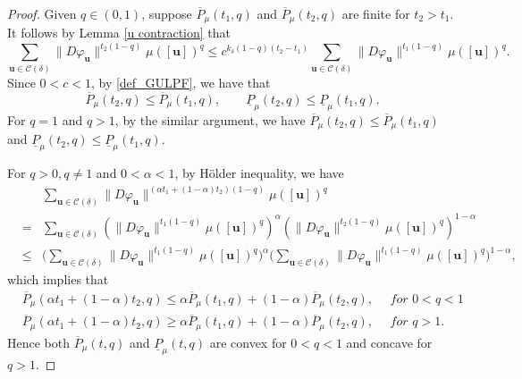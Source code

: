 \documentclass[12pt]{amsart}
\theoremstyle{plain}
\theoremstyle{definition}
\theoremstyle{remark}
\newcommand{\bu}{\mathbf{u}}
\begin{document}
\begin{proof}
Given $q\in(0, 1)$,  suppose $\overline P_\mu(t_1, q)$ and $\overline P_\mu(t_2, q)$ are finite for $t_2>t_1$. It follows by Lemma \ref{u contraction} that
$$
\sum_{\mathbf{u}\in\mathcal{C}(\delta)}\|D\varphi_\mathbf{u}\|^{t_2(1-q)}\mu([\bu])^q
\le c^{k_\delta(1-q)(t_2-t_1)}\sum_{\mathbf{u}\in\mathcal{C}(\delta)}\|D\varphi_\mathbf{u}\|^{t_1(1-q)}\mu([\bu])^q. 
$$
Since $0<c<1$, by \eqref{def_GULPF},  we have that
$$
\overline P_\mu(t_2, q)\le\overline P_\mu(t_1, q),   \qquad  \underline P_\mu(t_2, q)\le\underline P_\mu(t_1, q).
$$
For $q=1$ and $q>1$,  by the similar argument,  we have  $\overline P_\mu(t_2, q) \leq  \overline P_\mu(t_1, q)$ and $\underline P_\mu(t_2, q)\le\underline P_\mu(t_1, q)$.

For $q>0, q\not=1$ and $0<\alpha<1$, by Hölder inequality, we have
\begin{eqnarray*}
&&\sum_{\mathbf{u}\in\mathcal{C}(\delta)}\|D\varphi_\mathbf{u}\|^{(\alpha t_1+(1-\alpha) t_2)(1-q)}\mu([\bu])^q   \\
&=&\sum_{\mathbf{u}\in\mathcal{C}(\delta)}(\|D\varphi_\mathbf{u}\|^{t_1(1-q)}\mu([\bu])^q)^\alpha(\|D\varphi_\mathbf{u}\|^{t_2(1-q)}\mu([\bu])^q)^{1-\alpha}  \\
&\le&\Big(\sum_{\mathbf{u}\in\mathcal{C}(\delta)}\|D\varphi_\mathbf{u}\|^{ t_1(1-q)}\mu([\bu])^q\Big)^\alpha \Big(\sum_{\mathbf{u}\in\mathcal{C}(\delta)}\|D\varphi_\mathbf{u}\|^{ t_1(1-q)}\mu([\bu])^q \Big)^{1-\alpha},
\end{eqnarray*}
which implies that 
\begin{equation*}\begin{split}
&\overline P_\mu(\alpha t_1+(1-\alpha) t_2, q)\le\alpha \overline P_\mu(t_1, q)+(1-\alpha)\overline P_\mu( t_2, q), \quad \textit{ for $0<q<1$} \\ 
&\overline P_\mu(\alpha t_1+(1-\alpha) t_2, q)\ge\alpha \overline P_\mu(t_1, q)+(1-\alpha)\overline P_\mu( t_2, q) ,  \quad \textit{ for $q>1$}. 
\end{split}
\end{equation*}
  Hence both $\overline P_\mu(t, q)$ and  $\underline P_\mu(t, q)$  are   convex  for $0<q<1$ and  concave   for $q>1$.
\end{proof}
\end{document}
